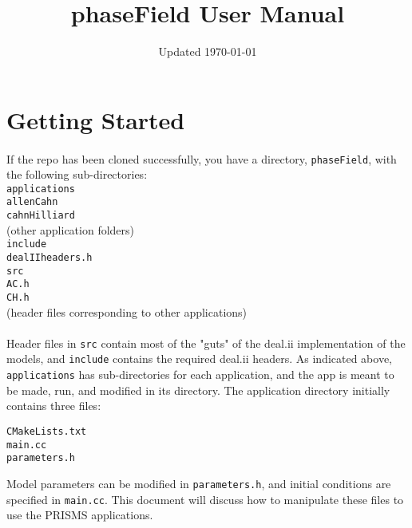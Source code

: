 \documentclass[11pt]{article} %
\title{phaseField User Manual}
\date{Updated \today}
\begin{document}
\maketitle

\section{Getting Started}
\paragraph{}
If the repo has been cloned successfully, you have a directory, \texttt{phaseField}, with the following sub-directories: \\
\texttt{applications} \\
\indent{} \texttt{allenCahn} \\
\indent{} \texttt{cahnHilliard} \\
\indent{} (other application folders) \\
\texttt{include} \\
\indent{} \texttt{dealIIheaders.h} \\
\texttt{src} \\
\indent{} \texttt{AC.h} \\
\indent{} \texttt{CH.h} \\
\indent{} (header files corresponding to other applications) \\
\paragraph{}
Header files in \texttt{src} contain most of the "guts" of the deal.ii implementation of the models, and \texttt{include} contains the required deal.ii headers.  As indicated above, \texttt{applications} has sub-directories for each application, and the app is meant to be made, run, and modified in its directory.  The application directory initially contains three files:
\begin{center}
\texttt{CMakeLists.txt}\\
\texttt{main.cc}\\
\texttt{parameters.h}
\end{center}
Model parameters can be modified in \texttt{parameters.h}, and initial conditions are specified in \texttt{main.cc}.  This document will discuss how to manipulate these files to use the PRISMS applications.

\end{document}

